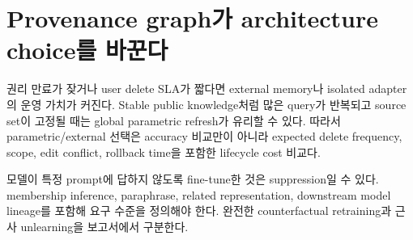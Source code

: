 \section{Provenance graph가 architecture choice를 바꾼다}

권리 만료가 잦거나 user delete SLA가 짧다면 external memory나 isolated adapter의 운영 가치가 커진다.
Stable public knowledge처럼 많은 query가 반복되고 source set이 고정될 때는 global parametric refresh가
유리할 수 있다. 따라서 parametric/external 선택은 accuracy 비교만이 아니라 expected delete frequency,
scope, edit conflict, rollback time을 포함한 lifecycle cost 비교다.

\begin{cautionbox}
모델이 특정 prompt에 답하지 않도록 fine-tune한 것은 suppression일 수 있다. membership inference,
paraphrase, related representation, downstream model lineage를 포함해 요구 수준을 정의해야 한다. 완전한
counterfactual retraining과 근사 unlearning을 보고서에서 구분한다.
\end{cautionbox}
